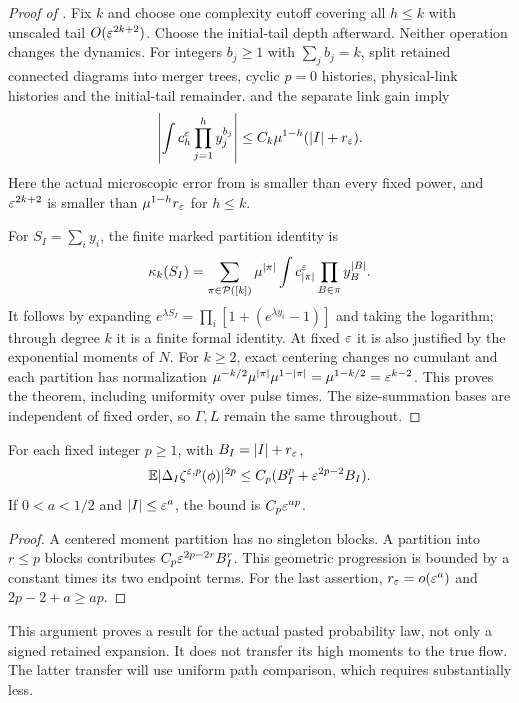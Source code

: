 \begin{proof}[Proof of ]
Fix $k$ and choose one complexity cutoff covering all $h\leq k$ with
unscaled tail $O(\varepsilon^{2k+2})$. Choose the initial-tail depth afterward.
Neither operation changes the dynamics.
For integers $b_j\geq1$ with $\sum_jb_j=k$, split retained connected
diagrams into merger trees, cyclic $p=0$ histories, physical-link
histories and the initial-tail remainder.
 and the separate link gain imply
\[
 \left|\int c_h^\varepsilon\prod_{j=1}^h y_j^{b_j}\right|
       \leq C_k\mu^{1-h}(|I|+r_\varepsilon).
\]
Here the actual microscopic error from  is smaller
than every fixed power, and $\varepsilon^{2k+2}$ is smaller than
$\mu^{1-h}r_\varepsilon$ for $h\leq k$.

For $S_I=\sum_i y_i$, the finite marked partition identity is
\[
 \kappa_k(S_I)=\sum_{\pi\in\mathcal P([k])}
      \mu^{|\pi|}\int c_{|\pi|}^\varepsilon
                         \prod_{B\in\pi}y_B^{|B|}.
\]
It follows by expanding
$e^{\lambda S_I}=\prod_i[1+(e^{\lambda y_i}-1)]$ and taking the logarithm;
through degree $k$ it is a finite formal identity.
At fixed $\varepsilon$ it is also justified by the exponential moments of $N$.
For $k\geq2$, exact centering changes no cumulant and each partition
has normalization
$\mu^{-k/2}\mu^{|\pi|}\mu^{1-|\pi|}
=\mu^{1-k/2}=\varepsilon^{k-2}$.
This proves the theorem, including uniformity over pulse times.
The size-summation bases are independent of fixed order, so $\Gamma,L$
remain the same throughout.
\end{proof}

\begin{corollary}\label{cor:moments}
For each fixed integer $p\geq1$, with $B_I=|I|+r_\varepsilon$,
\[
 \mathbb E|\Delta_I\zeta^{\varepsilon,p}(\phi)|^{2p}
       \leq C_p(B_I^p+\varepsilon^{2p-2}B_I).
\]
If $0<a<1/2$ and $|I|\leq\varepsilon^a$, the bound is $C_p\varepsilon^{ap}$.
\end{corollary}
\begin{proof}
A centered moment partition has no singleton blocks.
A partition into $r\leq p$ blocks contributes
$C_p\varepsilon^{2p-2r}B_I^r$. This geometric progression is bounded by a
constant times its two endpoint terms. For the last assertion,
$r_\varepsilon=o(\varepsilon^a)$ and
$2p-2+a\geq ap$.
\end{proof}

This argument proves a result for the actual pasted probability law,
not only a signed retained expansion. It does not transfer its high
moments to the true flow. The latter transfer will use uniform path
comparison, which requires substantially less.
